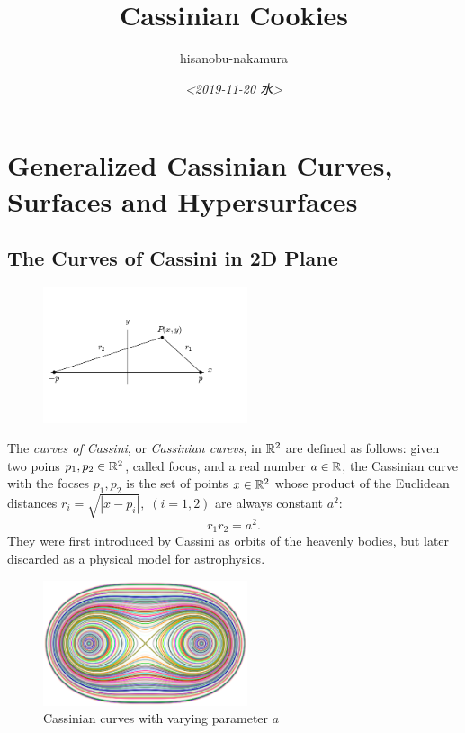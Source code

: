 \documentclass{article}
\author{hisanobu-nakamura}
\date{\textit{<2019-11-20 水>}}
\title{Cassinian Cookies}
\begin{document}
\maketitle
\tableofcontents


\section{Generalized Cassinian Curves, Surfaces and Hypersurfaces}
\label{sec-1}
\subsection{The Curves of Cassini in 2D Plane}
\label{sec-1-1}
\begin{figure}[h]
\begin{center}
\includegraphics[width=6cm]{cassini_generic_point.png}
\caption{}
\label{ }
\end{center}
\end{figure}
The \emph{curves of Cassini}, or \emph{Cassinian curevs}, in $\mathbb R^2$ are defined as follows: given two poins $p_1, p_2 \in \mathbb R^2$, called focus, and a real number $a \in \mathbb R$, 
the Cassinian curve with the focses $p_{1},p_{2}$ is the set of points $x \in \mathbb R^2$ whose product of the Euclidean distances $r_i = \sqrt{|x-p_i|}, \; (i=1,2)$ are always constant $a^2$:
\begin{equation}
\label{ }
r_1 r_2 = a^2.
\end{equation}
They were first introduced by Cassini as orbits of the heavenly bodies, but later discarded as a physical model for astrophysics.
\begin{figure}[h]
\begin{center}
\includegraphics[width=6cm]{images/cassini2.eps}
\caption{Cassinian curves with varying parameter $a$}
\label{ }
\end{center}
\end{figure}
\end{document}
